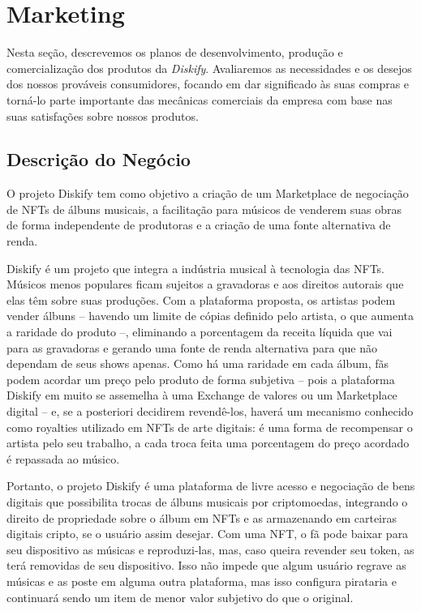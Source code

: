 \documentclass[onecolumn,12pt]{asme2ej}
\begin{document}
\section{Marketing}

Nesta seção, descrevemos os planos de desenvolvimento, produção e comercialização dos produtos da {\it Diskify}. Avaliaremos as necessidades e os desejos dos nossos prováveis consumidores, focando em dar significado às suas compras e torná-lo parte importante das mecânicas comerciais da empresa com base nas suas satisfações sobre nossos produtos.

\subsection{Descrição do Negócio}

O projeto Diskify tem como objetivo a criação de um Marketplace de negociação de NFTs de álbuns musicais, a facilitação para músicos de venderem suas obras de forma independente de produtoras e a criação de uma fonte alternativa de renda.

Diskify é um projeto que integra a indústria musical à tecnologia das NFTs. Músicos menos populares ficam sujeitos a gravadoras e aos direitos autorais que elas têm sobre suas produções. Com a plataforma proposta, os artistas podem vender álbuns – havendo um limite de cópias definido pelo artista, o que aumenta a raridade do produto –, eliminando a porcentagem da receita líquida que vai para as gravadoras e gerando uma fonte de renda alternativa para que não dependam de seus shows apenas. Como há uma raridade em cada álbum, fãs podem acordar um preço pelo produto de forma subjetiva – pois a plataforma Diskify em muito se assemelha à uma Exchange de valores ou um Marketplace digital – e, se a posteriori decidirem revendê-los, haverá um mecanismo conhecido como royalties utilizado em NFTs de arte digitais: é uma forma de recompensar o artista pelo seu trabalho, a cada troca feita uma porcentagem do preço acordado é repassada ao músico.

Portanto, o projeto Diskify é uma plataforma de livre acesso e negociação de bens digitais que possibilita trocas de álbuns musicais por criptomoedas, integrando o direito de propriedade sobre o álbum em NFTs e as armazenando em carteiras digitais cripto, se o usuário assim desejar. Com uma NFT, o fã pode baixar para seu dispositivo as músicas e reproduzi-las, mas, caso queira revender seu token, as terá removidas de seu dispositivo. Isso não impede que algum usuário regrave as músicas e as poste em alguma outra plataforma, mas isso configura pirataria e continuará sendo um item de menor valor subjetivo do que o original.
\end{document}
